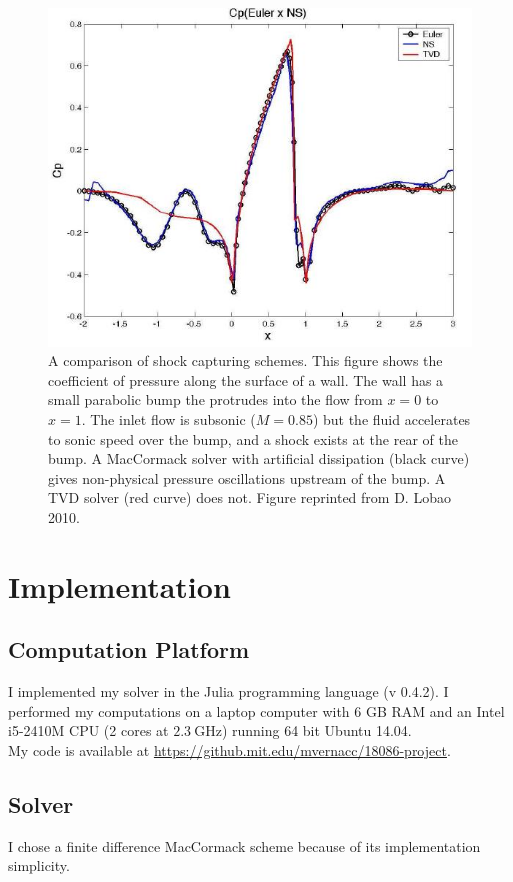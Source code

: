 \documentclass[paper=a4, fontsize=11pt]{scrartcl}
\numberwithin{equation}{section}        %
\numberwithin{figure}{section}          %
\numberwithin{table}{section}               %
\begin{document}
\begin{figure}[H]
    \centering
    \includegraphics[width = 0.8 \textwidth]{figures/lobao_mc_tvd.png}
    \caption{A comparison of shock capturing schemes. This figure shows the coefficient of pressure along the surface of a wall. The wall has a small parabolic bump the protrudes into the flow from $x = 0$ to $x = 1$. The inlet flow is subsonic ($M= 0.85$) but the fluid accelerates to sonic speed over the bump, and a shock exists at the rear of the bump. A MacCormack solver with artificial dissipation (black curve) gives non-physical pressure oscillations upstream of the bump. A TVD solver (red curve) does not. Figure reprinted from D. Lobao 2010.}
    \label{fig:lobao_mc_tvd}
\end{figure}


\section{Implementation}
\subsection{Computation Platform}
I implemented my solver in the Julia programming language (v 0.4.2). I performed my computations on a laptop computer with 6 GB RAM and an Intel i5-2410M CPU (2 cores at $\SI{2.3}{\giga\hertz}$) running 64 bit Ubuntu 14.04.\\

My code is available at \url{https://github.mit.edu/mvernacc/18086-project}.

\subsection{Solver}
I chose a finite difference MacCormack scheme because of its implementation simplicity.
\end{document}
